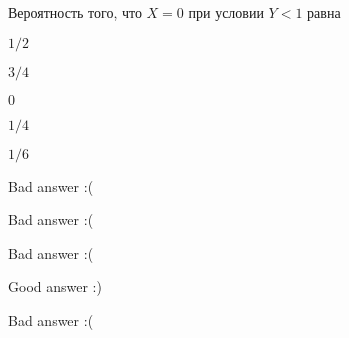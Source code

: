 
\begin{question}
Вероятность того, что \(X=0\) при условии \(Y<1\) равна
\begin{answerlist}
  \item \(1/2\)
  \item \(3/4\)
  \item \(0\)
  \item \(1/4\)
  \item \(1/6\)
\end{answerlist}
\end{question}

\begin{solution}
\begin{answerlist}
  \item Bad answer :(
  \item Bad answer :(
  \item Bad answer :(
  \item Good answer :)
  \item Bad answer :(
\end{answerlist}
\end{solution}

